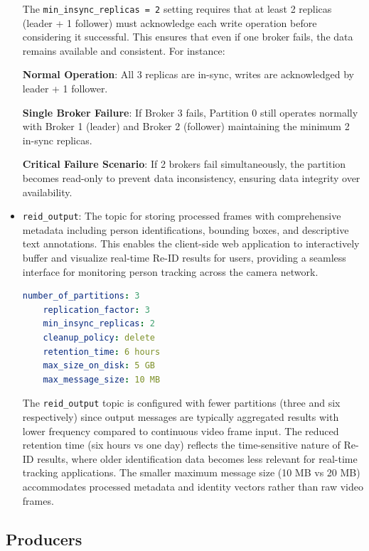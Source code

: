 \begin{itemize}
    The \texttt{min\_insync\_replicas = 2} setting requires that at least 2 replicas (leader + 1 follower) must acknowledge each write operation before considering it successful. This ensures that even if one broker fails, the data remains available and consistent. For instance:
    
    \textbf{Normal Operation}: All 3 replicas are in-sync, writes are acknowledged by leader + 1 follower.
    
    \textbf{Single Broker Failure}: If Broker 3 fails, Partition 0 still operates normally with Broker 1 (leader) and Broker 2 (follower) maintaining the minimum 2 in-sync replicas.
    
    \textbf{Critical Failure Scenario}: If 2 brokers fail simultaneously, the partition becomes read-only to prevent data inconsistency, ensuring data integrity over availability.
    
    \item \texttt{reid\_output}: The topic for storing processed frames with comprehensive metadata including person identifications, bounding boxes, and descriptive text annotations. This enables the client-side web application to interactively buffer and visualize real-time Re-ID results for users, providing a seamless interface for monitoring person tracking across the camera network.
    
    \begin{lstlisting}[language=yaml]
    number_of_partitions: 3
    replication_factor: 3
    min_insync_replicas: 2
    cleanup_policy: delete
    retention_time: 6 hours
    max_size_on_disk: 5 GB
    max_message_size: 10 MB
    \end{lstlisting}
    
    The \texttt{reid\_output} topic is configured with fewer partitions (three and six respectively) since output messages are typically aggregated results with lower frequency compared to continuous video frame input. The reduced retention time (six hours vs one day) reflects the time-sensitive nature of Re-ID results, where older identification data becomes less relevant for real-time tracking applications. The smaller maximum message size (10 MB vs 20 MB) accommodates processed metadata and identity vectors rather than raw video frames.
\end{itemize}

\subsection{Producers}

